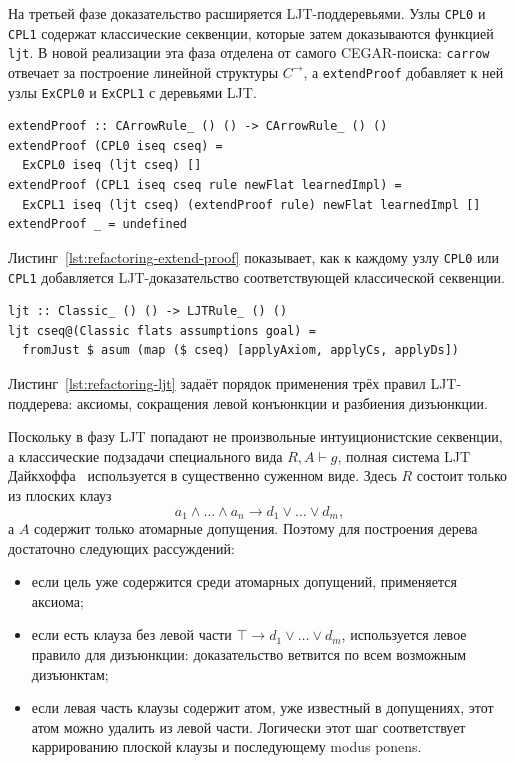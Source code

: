\documentclass[14pt, russian]{scrartcl}
\begin{document}
На третьей фазе доказательство расширяется LJT-поддеревьями. Узлы
\texttt{CPL0} и \texttt{CPL1} содержат классические секвенции, которые затем
доказываются функцией \texttt{ljt}. В новой реализации эта фаза отделена от
самого CEGAR-поиска: \texttt{carrow} отвечает за построение линейной структуры
$C^{\rightarrow}$, а \texttt{extendProof} добавляет к ней узлы
\texttt{ExCPL0} и \texttt{ExCPL1} с деревьями LJT.

\begin{listing}[!htb]
\caption{Добавление LJT-поддеревьев к доказательству $C^{\rightarrow}$}
\label{lst:refactoring-extend-proof}
\begin{verbatim}
extendProof :: CArrowRule_ () () -> CArrowRule_ () ()
extendProof (CPL0 iseq cseq) =
  ExCPL0 iseq (ljt cseq) []
extendProof (CPL1 iseq cseq rule newFlat learnedImpl) =
  ExCPL1 iseq (ljt cseq) (extendProof rule) newFlat learnedImpl []
extendProof _ = undefined
\end{verbatim}
\end{listing}

Листинг~\ref{lst:refactoring-extend-proof} показывает, как к каждому узлу
\texttt{CPL0} или \texttt{CPL1} добавляется LJT-доказательство соответствующей
классической секвенции.

\begin{listing}[!htb]
\caption{Функция построения LJT-доказательства \texttt{ljt}}
\label{lst:refactoring-ljt}
\begin{verbatim}
ljt :: Classic_ () () -> LJTRule_ () ()
ljt cseq@(Classic flats assumptions goal) =
  fromJust $ asum (map ($ cseq) [applyAxiom, applyCs, applyDs])
\end{verbatim}
\end{listing}

Листинг~\ref{lst:refactoring-ljt} задаёт порядок применения трёх правил
LJT-поддерева: аксиомы, сокращения левой конъюнкции и разбиения дизъюнкции.

Поскольку в фазу LJT попадают не произвольные интуиционистские секвенции, а
классические подзадачи специального вида $R, A \vdash g$, полная система LJT
Дайкхоффа~\cite{Dyckhoff1992} используется в существенно суженном виде. Здесь
$R$ состоит только из плоских клауз
\[
a_1 \land \ldots \land a_n \rightarrow d_1 \lor \ldots \lor d_m,
\]
а $A$ содержит только атомарные допущения. Поэтому для построения дерева
достаточно следующих рассуждений:
\begin{itemize}
\item если цель уже содержится среди атомарных допущений, применяется аксиома;
\item если есть клауза без левой части $\top \rightarrow d_1 \lor \ldots \lor d_m$,
  используется левое правило для дизъюнкции: доказательство ветвится по всем
  возможным дизъюнктам;
\item если левая часть клаузы содержит атом, уже известный в допущениях, этот
  атом можно удалить из левой части. Логически этот шаг соответствует
  каррированию плоской клаузы и последующему modus ponens.
\end{itemize}
\end{document}
